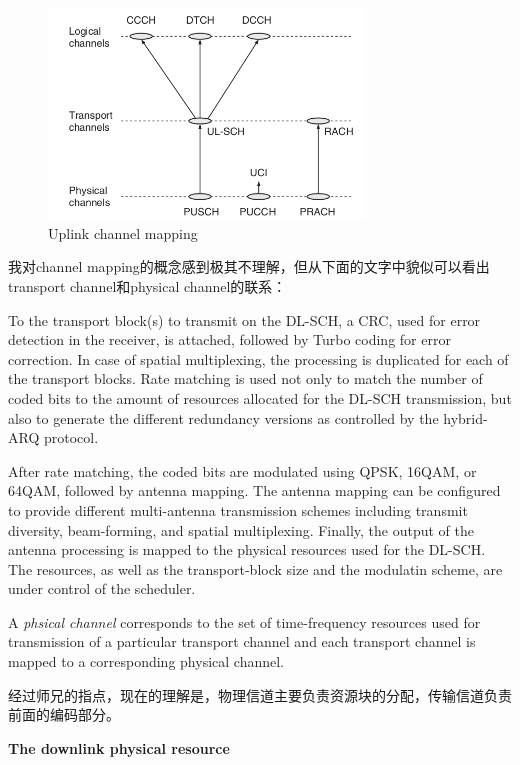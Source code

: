 \documentclass[titlepage]{article}
\numberwithin{figure}{section}
\numberwithin{equation}{section}
\begin{document}
\begin{figure}[htbp]
	\centering
	\includegraphics[height=2.2in]{ULCH}
	\caption{Uplink channel mapping}
\end{figure}

我对channel mapping的概念感到极其不理解，但从下面的文字中貌似可以看出transport channel和physical channel的联系：

To the transport block(s) to transmit on the DL-SCH, a CRC, used for error detection in the receiver, is attached, followed by Turbo coding for error correction. In case of spatial multiplexing, the processing is duplicated for each of the transport blocks. Rate matching is used not only to match the number of coded bits to the amount of resources allocated for the DL-SCH transmission, but also to generate the different redundancy versions as controlled by the hybrid-ARQ protocol.

After rate matching, the coded bits are modulated using QPSK, 16QAM, or 64QAM, followed by antenna mapping. The antenna mapping can be configured to provide different multi-antenna transmission schemes including transmit diversity, beam-forming, and spatial multiplexing. Finally, the output of the antenna processing is mapped to the physical resources used for the DL-SCH. The resources, as well as the transport-block size and the modulatin scheme, are under control of the scheduler.

A \textit{phsical channel} corresponds to the set of time-frequency resources used for transmission of a particular transport channel and each transport channel is mapped to a corresponding physical channel.

经过师兄的指点，现在的理解是，物理信道主要负责资源块的分配，传输信道负责前面的编码部分。

\textbf{The downlink physical resource}
\end{document}
